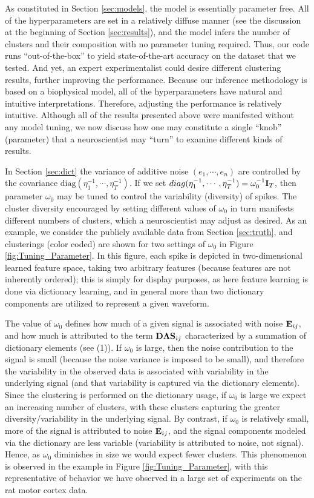 \documentclass[journal]{IEEEtran}
\begin{document}
As constituted in Section \ref{sec:models}, the model is essentially parameter free. All of the hyperparameters are set in a relatively diffuse manner (see the discussion at the beginning of Section \ref{sec:results}), and the model infers the number of clusters and their composition with no parameter tuning required. Thus, our code runs ``out-of-the-box'' to yield state-of-the-art accuracy on the dataset that we tested.  And yet, an expert experimentalist could desire different clustering results, further improving the performance.  Because our inference methodology is based on a biophysical model, all of the hyperparameters have natural and intuitive interpretations.  Therefore, adjusting the performance is relatively intuitive.  
Although all of the results presented above were manifested without any model tuning, we now discuss how one may constitute a single ``knob'' (parameter) that a neuroscientist may ``turn'' to examine different kinds of results.


In Section \ref{sec:dict} the variance of additive noise $(e_1,\cdots, e_n)$ are controlled by the covariance $\mbox{diag}(\eta_1^{-1},\cdots, \eta_T^{-1})$. If we set $\relax{diag}(\eta_1^{-1},\cdots, \eta_T^{-1})=\omega_0^{-1}{\mathbf I}_T$, then parameter $\omega_0$ may be tuned to control the variability (diversity) of spikes. The cluster diversity encouraged by setting different values of $\omega_0$ in turn manifests different numbers of clusters, which a neuroscientist may adjust as desired. As an example, we consider the publicly available data from Section \ref{sec:truth}, and clusterings (color coded) are shown for two settings of $\omega_0$ {in } Figure \ref{fig:Tuning_Parameter}. In this figure{,} each spike is depicted in two-dimensional {learned feature} space, taking {two arbitrary features (because features are not inherently ordered)}; this is simply for display purposes, as here feature learning is done via dictionary learning, and in general more than two dictionary components are utilized to represent a given waveform.

The value of $\omega_0$ defines how much of a given signal is associated with noise ${\mathbf E}_{ij}$, and how much is attributed to the term ${\mathbf D}\boldsymbol{\Lambda}{\mathbf S}_{ij}$ characterized by a summation of dictionary elements (see (1)). If $\omega_0$ is large, then the noise contribution to the signal is small (because the noise variance is imposed to be small), and therefore the variability in the observed data is associated with variability in the underlying signal (and that variability is captured via the dictionary elements). Since the clustering is performed on the dictionary usage, if $\omega_0$ is large we expect an increasing number of clusters, with these clusters capturing the greater diversity/variability in the underlying signal. By contrast, if $\omega_0$ is relatively small, more of the signal is attributed to noise ${\mathbf E}_{ij}$, and the signal components modeled via the dictionary are less variable (variability is attributed to noise, not signal). Hence, as $\omega_0$ diminishes in size we would expect fewer clusters. This phenomenon is observed in the example in Figure \ref{fig:Tuning_Parameter}, with this representative of behavior we have observed in a large set of experiments{ on the rat motor cortex data}.
\end{document}
